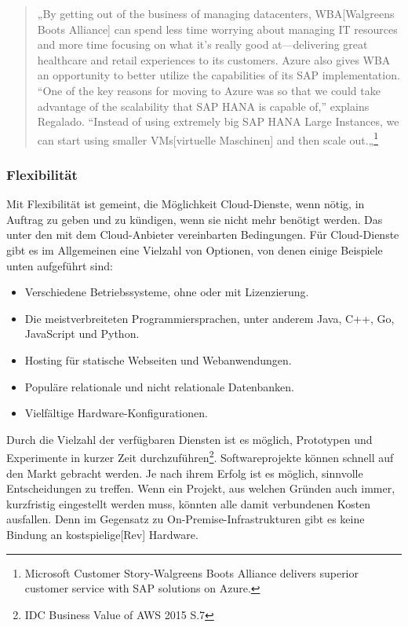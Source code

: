 \begin{quote}
      „By getting out of the business of managing datacenters, WBA[Walgreens Boots Alliance] can spend less time worrying about managing IT resources and more time focusing on what it’s really good at—delivering great healthcare and retail experiences to its customers. Azure also gives WBA an opportunity to better utilize the capabilities of its SAP implementation. “One of the key reasons for moving to Azure was so that we could take advantage of the scalability that SAP HANA is capable of,” explains Regalado. “Instead of using extremely big SAP HANA Large Instances, we can start using smaller VMs[virtuelle Maschinen] and then scale out.„\footnote{Microsoft Customer Story-Walgreens Boots Alliance delivers superior customer service with SAP solutions on Azure.\cite{AZU01}}
\end{quote}

\subsubsection{Flexibilität}%
Mit Flexibilität ist gemeint, die Möglichkeit Cloud-Dienste, wenn nötig, in Auftrag zu geben und zu kündigen, wenn sie nicht mehr benötigt werden. Das unter den mit dem Cloud-Anbieter vereinbarten Bedingungen.
Für Cloud-Dienste gibt es im Allgemeinen eine Vielzahl von Optionen, von denen einige Beispiele unten aufgeführt sind:
\begin{itemize}
\item
    Verschiedene Betriebssysteme, ohne oder mit Lizenzierung.
\item
    Die meistverbreiteten Programmiersprachen, unter anderem Java, C++, Go, JavaScript und Python.{\cite{AMZ03}}
\item
    Hosting für statische Webseiten und Webanwendungen{\cite{AMZ04}}.
\item
    Populäre relationale und nicht relationale Datenbanken{\cite{AMZ10}}.           
\item
    Vielfältige Hardware-Konfigurationen.

\end{itemize}
\begin{flushleft}
Durch die Vielzahl der verfügbaren Diensten ist es möglich, Prototypen und Experimente in kurzer Zeit durchzuführen\footnote{IDC Business Value of AWS 2015 S.7\cite{IDC01}}. Softwareprojekte können schnell auf den Markt gebracht werden. Je nach ihrem Erfolg ist es möglich, sinnvolle Entscheidungen zu treffen. Wenn ein Projekt, aus welchen Gründen auch immer, kurzfristig eingestellt werden muss, könnten alle damit verbundenen Kosten ausfallen. Denn im Gegensatz zu On-Premise-Infrastrukturen gibt es keine Bindung an kostspielige[Rev] Hardware.
\end{flushleft}

